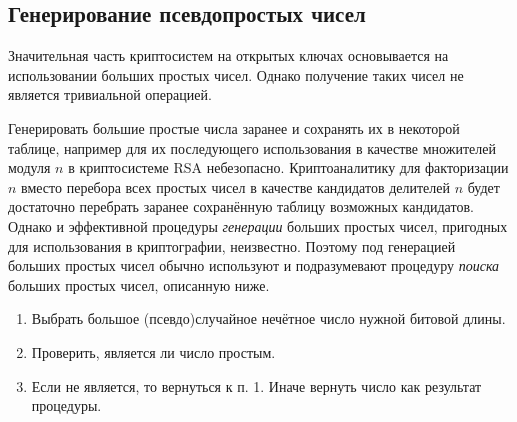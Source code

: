 \subsection{Генерирование псевдопростых чисел}\label{section-pseudo-primes-generation}

Значительная часть криптосистем на открытых ключах основывается на использовании больших простых чисел. Однако получение таких чисел не является тривиальной операцией.

Генерировать большие простые числа заранее и сохранять их в некоторой таблице, например для их последующего использования в качестве множителей модуля $n$ в криптосистеме RSA небезопасно. Криптоаналитику для факторизации $n$ вместо перебора всех простых чисел в качестве кандидатов делителей $n$ будет достаточно перебрать заранее сохранённую таблицу возможных кандидатов. Однако и эффективной процедуры \emph{генерации} больших простых чисел, пригодных для использования в криптографии, неизвестно. Поэтому под генерацией больших простых чисел обычно используют и подразумевают процедуру \emph{поиска} больших простых чисел, описанную ниже.

\begin{enumerate}
	\item Выбрать большое (псевдо)случайное нечётное число нужной битовой длины.
	\item Проверить, является ли число простым.
	\item Если не является, то вернуться к п. 1. Иначе вернуть число как результат процедуры.
\end{enumerate}

